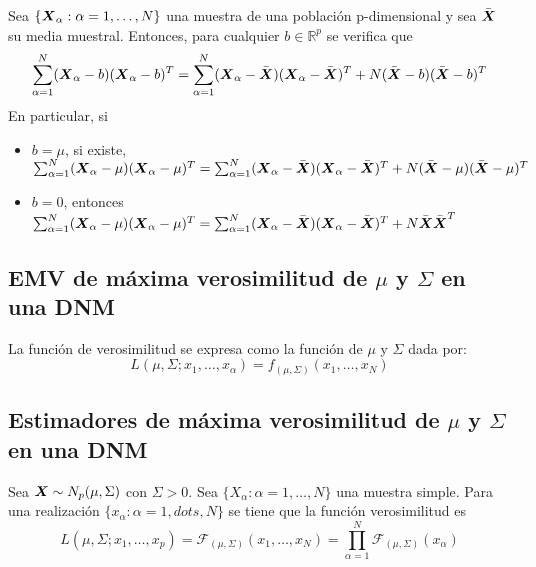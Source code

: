 \begin{lema}
  Sea $\{\boldsymbol{X}_\alpha: \alpha = 1,\dots , N\}$ una muestra de una población p-dimensional y sea $\bar{\boldsymbol{X}}$ su media muestral. Entonces, para cualquier $b\in \mathbb R^p$ se verifica que
  \[
\sum_{\alpha = 1}^N(\boldsymbol{X}_\alpha - b)(\boldsymbol{X}_\alpha - b)^T = \sum_{\alpha = 1}^N(\boldsymbol{X}_\alpha - \bar{\boldsymbol{X}})(\boldsymbol{X}_\alpha - \bar{\boldsymbol{X}})^T + N(\bar{\boldsymbol{X}} - b)(\bar{\boldsymbol{X}} - b)^T
\]
En particular, si 

\begin{itemize}
\item $b = \mu$, si existe,$\sum_{\alpha = 1}^N(\boldsymbol{X}_\alpha - \mu)(\boldsymbol{X}_\alpha - \mu)^T = \sum_{\alpha = 1}^N(\boldsymbol{X}_\alpha - \bar{\boldsymbol{X}})(\boldsymbol{X}_\alpha - \bar{\boldsymbol{X}})^T + N(\bar{\boldsymbol{X}} - \mu)(\bar{\boldsymbol{X}} - \mu)^T$

  \item $b = 0$, entonces $\sum_{\alpha = 1}^N(\boldsymbol{X}_\alpha - \mu)(\boldsymbol{X}_\alpha - \mu)^T = \sum_{\alpha = 1}^N(\boldsymbol{X}_\alpha - \bar{\boldsymbol{X}})(\boldsymbol{X}_\alpha - \bar{\boldsymbol{X}})^T + N\bar{\boldsymbol{X}}\bar{\boldsymbol{X}}^T$
\end{itemize}
\end{lema}

\subsection{EMV de máxima verosimilitud de $\mu$ y $\Sigma$ en una DNM}

\begin{ndef}
  La función de verosimilitud se expresa como la función de $\mu$ y $\Sigma$ dada por:
  \[
L(\mu,\Sigma;x_1,\dots,x_\alpha) = f_{(\mu,\Sigma)}(x_1,\dots,x_N)
  \]
\end{ndef}












\subsection{Estimadores de máxima verosimilitud de $\mu$ y $\Sigma$ en una DNM}

\begin{ndef}
  Sea $\boldsymbol{X} \sim N_p(\mu,\Sigma)$ con $\Sigma > 0$. Sea $\{X_\alpha : \alpha =1,\dots,N \}$ una muestra simple. Para una realización $\{ x_\alpha : \alpha = 1, dots, N\}$ se tiene que la función verosimilitud es
  \[
  L(\mu,\Sigma;x_1,\dots,x_p) = \mathcal F_{(\mu,\Sigma)}(x_1,\dots,x_N) = \prod_{\alpha = 1}^N \mathcal F_{(\mu,\Sigma)}(x_\alpha)
  \]

\end{ndef}

